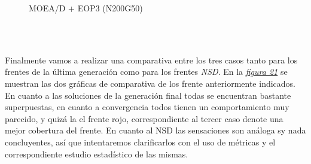 \begin{minipage}[H]{\linewidth}
\begin{minipage}[b]{0.3\linewidth}
\begin{figure}[H]
        \caption{\centering MOEA/D + EOP3 (N200G50)}
        \label{fig:20}
    \end{figure}
    \end{minipage}\\
\end{minipage}\\

Finalmente vamos a realizar una comparativa entre los tres casos tanto para los frentes de la última generación como para los frentes \textit{NSD}. En la \hyperref[fig:21]{\textit{figura 21}} se muestran las dos gráficas de comparativa de los frente anteriormente indicados. En cuanto a las soluciones de la generación final todas se encuentran bastante superpuestas, en cuanto a convergencia todos tienen un comportamiento muy parecido, y quizá la el frente rojo, correspondiente al tercer caso denote una mejor cobertura del frente. En cuanto al NSD las sensaciones son análoga sy nada concluyentes, así que intentaremos clarificarlos con el uso de métricas y el correspondiente estudio estadístico de las mismas.\\ 

